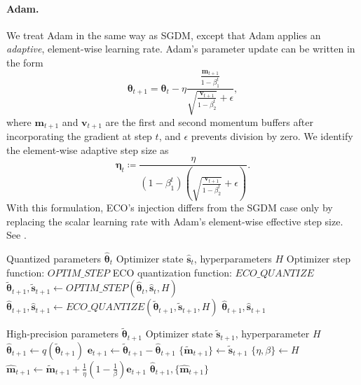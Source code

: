 \documentclass[11pt, a4paper, onecolumn, copyright, goog]{google}
\newcommand{\methodname}{ECO}
\newcommand{\vect}[1]{\mathbf{#1}}
\newcommand{\vtheta}{\boldsymbol{\theta}}
\newcommand{\veta}{\boldsymbol{\eta}}
\newcommand{\vm}{\vect{m}}
\newcommand{\vvv}{\vect{v}}
\newcommand{\ve}{\vect{e}}
\newcommand{\vs}{\vect{s}}
\newcommand{\qfn}{\textit{q}}
\newcommand{\qfneco}{\textit{ECO\_QUANTIZE}}
\newcommand{\optfn}{\textit{OPTIM\_STEP}}
\theoremstyle{plain}
\theoremstyle{definition}
\theoremstyle{remark}
\begin{document}
\paragraph{Adam.}
We treat Adam in the same way as SGDM, except that Adam applies an \emph{adaptive}, element-wise learning rate. Adam's parameter update can be written in the form
$$
\vtheta_{t+1} = \vtheta_t - \eta \frac{\frac{\vm_{t+1}}{1-\beta_1^t}}{\sqrt{\frac{\vvv_{t+1}}{1-\beta_2^t}} + \epsilon},
$$
where $\vm_{t+1}$ and $\vvv_{t+1}$ are the first and second momentum buffers after incorporating the gradient at step $t$, and $\epsilon$ prevents division by zero. We identify the element-wise adaptive step size as
$$
\veta_t
\coloneq
\frac{\eta}{(1-\beta_1^t) (\sqrt{\frac{\vvv_{t+1}}{1-\beta_2^t}} + \epsilon)}.
$$
With this formulation, \methodname{}'s injection differs from the SGDM case only by replacing the scalar learning rate with Adam's element-wise effective step size. See .


\begin{algorithm}[ht]
\caption{Quantized Training Step $t$ with \methodname{}}
\label{alg:sgd+eco}
\begin{algorithmic}[1]
\Require Quantized parameters $\hat{\vtheta}_t$
\Require Optimizer state $\hat{\vs}_t$, hyperparameters $H$
\Require Optimizer step function: $\optfn$
\Require \methodname{} quantization function: $\qfneco$
\State $\tilde{\vtheta}_{t+1}, \tilde{\vs}_{t+1} \leftarrow \optfn(\hat{\vtheta}_{t}, \hat{\vs}_{t}, H)$ 
\State $\hat{\vtheta}_{t+1}, \hat{\vs}_{t+1} \leftarrow \qfneco(\tilde{\vtheta}_{t+1}, \tilde{\vs}_{t+1}, H)$ 
\State \Return $\hat{\vtheta}_{t+1}, \hat{\vs}_{t+1}$
\end{algorithmic}
\end{algorithm}

\begin{algorithm}[ht]
\caption{$\qfneco$ for SGD with Momentum}
\label{alg:qeco_sgd}
\begin{algorithmic}[1]
\Require High-precision parameters $\tilde{\vtheta}_{t+1}$
\Require Optimizer state $\tilde{\vs}_{t+1}$, hyperparameter $H$
\State $\hat{\vtheta}_{t+1} \leftarrow \qfn(\tilde{\vtheta}_{t+1})$ 
\State $\ve_{t+1} \leftarrow \tilde{\vtheta}_{t+1}-\hat{\vtheta}_{t+1}$ 
\State $\{\tilde{\vm}_{t+1}\} \leftarrow \tilde{\vs}_{t+1}$ 
\State $\{\eta, \beta\} \leftarrow H$ 
\State $\hat{\vm}_{t+1} \leftarrow \tilde{\vm}_{t+1} + \frac{1}{\eta}(1-\frac{1}{\beta}) \ve_{t+1}$ 
\State \Return $\hat{\vtheta}_{t+1}, \{\hat{\vm}_{t+1}\}$
\end{algorithmic}
\end{algorithm}
\end{document}
